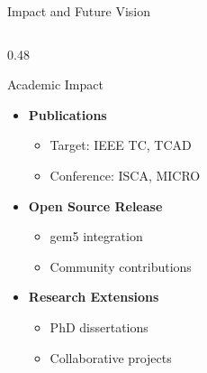 \documentclass[10pt,aspectratio=169]{beamer}
\begin{document}
\begin{frame}{Impact and Future Vision}
    \begin{columns}[T]
        \begin{column}{0.48\textwidth}
            \begin{block}{Academic Impact}
                \begin{itemize}
                    \item \textbf{Publications}
                    \begin{itemize}
                        \item Target: IEEE TC, TCAD
                        \item Conference: ISCA, MICRO
                    \end{itemize}
                    \item \textbf{Open Source Release}
                    \begin{itemize}
                        \item gem5 integration
                        \item Community contributions
                    \end{itemize}
                    \item \textbf{Research Extensions}
                    \begin{itemize}
                        \item PhD dissertations
                        \item Collaborative projects
                    \end{itemize}
                \end{itemize}
            \end{block}
        \end{column}
        

\end{columns}
\end{frame}
\end{document}
